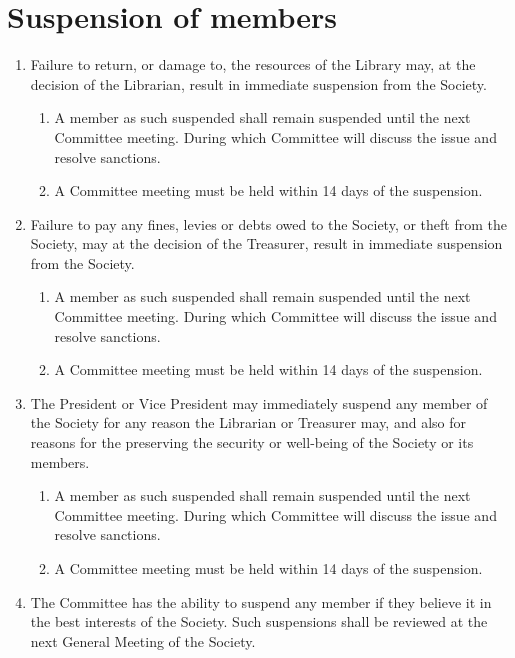 \documentclass[a4paper]{article}
\begin{document}
\section{Suspension of members} \label{sec:suspension}
\begin{enumerate}
    \item Failure to return, or damage to, the resources of the Library may, at the decision of the Librarian, result in immediate suspension from the Society.
          \begin{enumerate}
              \item A member as such suspended shall remain suspended until the next Committee meeting. During which Committee will discuss the issue and resolve sanctions.
              \item A Committee meeting must be held within 14 days of the suspension.
          \end{enumerate}
    \item Failure to pay any fines, levies or debts owed to the Society, or theft from the Society, may at the decision of the Treasurer, result in immediate suspension from the Society.
          \begin{enumerate}
              \item A member as such suspended shall remain suspended until the next Committee meeting. During which Committee will discuss the issue and resolve sanctions.
              \item A Committee meeting must be held within 14 days of the suspension.
          \end{enumerate}
    \item The President or Vice President may immediately suspend any member of the Society for any reason the Librarian or Treasurer may, and also for reasons for the preserving the security or well-being of the Society or its members.
          \begin{enumerate}
              \item A member as such suspended shall remain suspended until the next Committee meeting. During which Committee will discuss the issue and resolve sanctions.
              \item A Committee meeting must be held within 14 days of the suspension.
          \end{enumerate}
    \item The Committee has the ability to suspend any member if they believe it in the best interests of the Society. Such suspensions shall be reviewed at the next General Meeting of the Society.

\end{enumerate}
\end{document}

